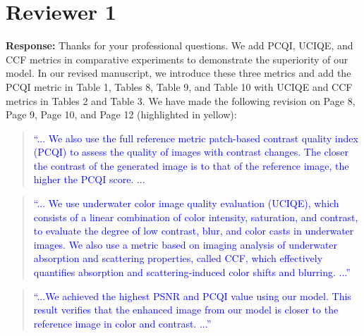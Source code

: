 \documentclass[a4paper,twoside,10pt]{reviewresponse}
\newcommand\tgray[1]{\textcolor{blue}{#1}}
\begin{document}
\section{Reviewer 1}
\textbf{Response:} 
Thanks for your professional questions. We add PCQI, UCIQE, and CCF metrics in comparative experiments to demonstrate the superiority of our model. In our revised manuscript, we introduce these three metrics and add the PCQI metric in Table 1, Tables 8, Table 9, and Table 10 with UCIQE and CCF metrics in Tables 2 and Table 3. We have made the following revision on Page 8, Page 9, Page 10, and Page 12 (highlighted in yellow):
\begin{quotation}
	\tgray{
		``... We also use the full reference metric patch-based contrast quality index (PCQI) to assess the quality of images with contrast changes. The closer the contrast of the generated image is to that of the reference image, the higher the PCQI score. ...
}
\end{quotation}

\begin{quotation}
	\tgray{
	``... We use underwater color image quality evaluation (UCIQE), which consists of a linear combination of color intensity, saturation, and contrast, to evaluate the degree of low contrast, blur, and color casts in underwater images. We also use a metric based on imaging analysis of underwater absorption and scattering properties, called CCF, which effectively quantifies absorption and scattering-induced color shifts and blurring. ...''
}
\end{quotation}

\begin{quotation}
	\tgray{
		``...We achieved the highest PSNR and PCQI value using our model. This result verifies that the enhanced image from our model is closer to the reference image in color and contrast. ...''
}
\end{quotation}
\end{document}
